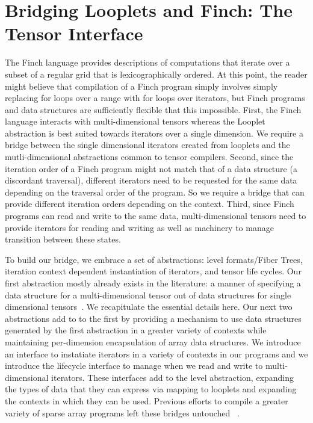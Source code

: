 \section{Bridging Looplets and Finch: The Tensor Interface}

%
The Finch language provides descriptions of computations that iterate over a subset of a regular grid that is lexicographically ordered.
%
At this point, the reader might believe that compilation of a Finch program simply involves simply replacing for loops over a range with for loops over iterators, but Finch programs and data structures are sufficiently flexible that this impossible.
%
First, the Finch language interacts with multi-dimensional tensors whereas the Looplet abstraction is best suited towards iterators over a single dimension.
%
We require a bridge between the single dimensional iterators created from looplets and the mutli-dimensional abstractions common to tensor compilers.
%
Second, since the iteration order of a Finch program might not match that of a data structure (a discordant traversal), different iterators need to be requested for the same data depending on the traversal order of the program.
%
So we require a bridge that can provide different iteration orders depending on the context.
%
Third, since Finch programs can read and write to the same data, multi-dimensional tensors need to provide iterators for reading and writing as well as machinery to manage transition between these states.


To build our bridge, we embrace a set of abstractions: level formats/Fiber Trees, iteration context dependent instantiation of iterators, and tensor life cycles.
%
Our first abstraction mostly already exists in the literature: a manner of specifying a data structure for a multi-dimensional tensor out of data structures for single dimensional tensors~\cite{sze2017efficient,chou2022compilation, chou2018format}.
%
We recapitulate the essential details here.
%
Our next two abstractions add to to the first by providing a mechanism to use data structures generated by the first abstraction in a greater variety of contexts while maintaining per-dimension encapsulation of array data structures.
%
We introduce an interface to instatiate iterators in a variety of contexts in our programs and we introduce the lifecycle interface to manage when we read and write to multi-dimensional iterators.
%
These interfaces add to the level abstraction, expanding the types of data that they can express via mapping to looplets and expanding the contexts in which they can be used.
%
Previous efforts to compile a greater variety of sparse array programs left these bridges untouched ~\cite{henry_compilation_2021, won2023unified, senanayake2020sparse}.

